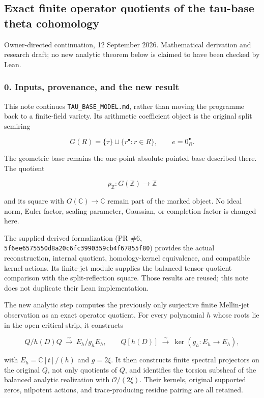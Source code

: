 \subsection{Exact finite operator quotients of the tau-base theta
cohomology}\label{pr_8:exact-finite-operator-quotients-of-the-tau-base-theta-cohomology}

Owner-directed continuation, 12 September 2026. Mathematical derivation and research draft; no new
analytic theorem below is claimed to have been checked by Lean.

\subsubsection{0. Inputs, provenance, and the new
result}\label{pr_8:inputs-provenance-and-the-new-result}

This note continues \nolinkurl{TAU_BASE_MODEL.md}, rather than moving the programme back to a
finite-field variety. Its arithmetic coefficient object is the original split semiring

\[G(R)=\{\tau\}\sqcup\{r^\bullet:r\in R\},\qquad e=0_R^\bullet.\]

The geometric base remains the one-point absolute pointed base described there. The quotient

\[p_{\mathbb Z}:G(\mathbb Z)\longrightarrow\mathbb Z\]

and its square with \(G(\mathbb C)\to\mathbb C\) remain part of the marked object. No ideal norm,
Euler factor, scaling parameter, Gaussian, or completion factor is changed here.

The supplied derived formalization (PR \#6, \nolinkurl{5f6ee6575550d8a20c6fc3990359cb4f67855f80})
provides the actual reconstruction, internal quotient, homology-kernel equivalence, and compatible
kernel actions. Its finite-jet module supplies the balanced tensor-quotient comparison with the
split-reflection square. Those results are reused; this note does not duplicate their Lean
implementation.

The new analytic step computes the previously only surjective finite Mellin-jet observation as an
exact operator quotient. For every polynomial \(h\) whose roots lie in the open critical strip, it
constructs

\[Q/h(D)Q\ \xrightarrow{\sim}\ E_h/g_hE_h,\qquad
Q[h(D)]\ \xrightarrow{\sim}\ \ker(g_h:E_h\to E_h),\]

with \(E_h=\mathbb C[t]/(h)\) and \(g=2\xi\). It then constructs finite spectral projectors on the
original \(Q\), not only quotients of \(Q\), and identifies the torsion subsheaf of the balanced
analytic realization with \(\mathcal O/(2\xi)\). Their kernels, original supported zeros, nilpotent
actions, and trace-producing residue pairing are all retained.

